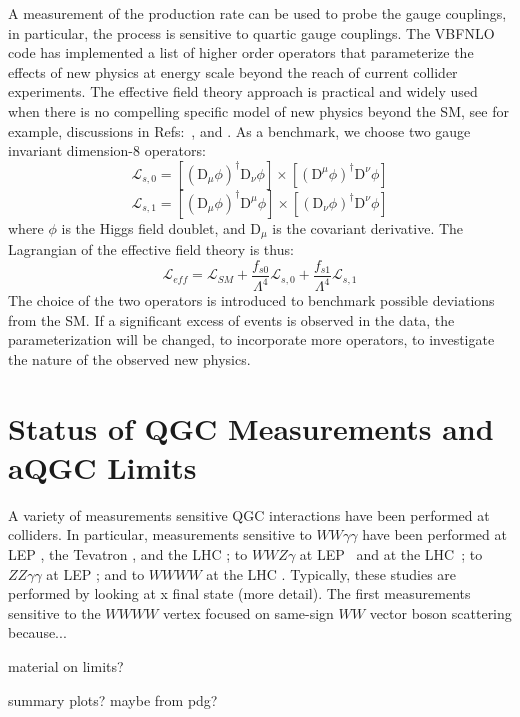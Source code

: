 A measurement
of the production rate can be used to probe the gauge couplings, in
particular, the process is sensitive to quartic gauge couplings. The
{\sc VBFNLO } code has implemented a list of higher order operators
that parameterize the effects of new physics at energy scale beyond
the reach of current collider experiments.  The effective field theory
approach is practical and widely used when there is no compelling
specific model of new physics beyond the SM, see for example,
discussions in Refs:~\cite{Hagiwara:1993ck}, \cite{Buchmuller:1985jz}
and \cite{Eboli:2006wa}.  As a benchmark, we choose two gauge
invariant dimension-8 operators:
\begin{equation}
\mathcal{L}_{s,0} = [(\mathrm{D}_\mu\phi)^\dag\mathrm{D}_\nu \phi]\times [(\mathrm{D}^\mu\phi)^\dag\mathrm{D}^\nu \phi]
\end{equation}
\begin{equation}
\mathcal{L}_{s,1} = [(\mathrm{D}_\mu\phi)^\dag\mathrm{D}^\mu \phi]\times [(\mathrm{D}_\nu\phi)^\dag\mathrm{D}^\nu \phi]
\end{equation}
where $\phi$ is the Higgs field doublet, and $\mathrm{D}_\mu$ is the covariant derivative. 
The Lagrangian of the effective field theory is thus: 
\begin{equation}
\mathcal{L}_{eff} = \mathcal{L}_{SM} + \frac{f_{s0}}{\Lambda^4}\mathcal{L}_{s,0}+\frac{f_{s1}}{\Lambda^4}\mathcal{L}_{s,1}
\end{equation}
The choice of the two operators is introduced to benchmark possible
deviations from the SM. If a significant excess of events is 
observed in the data, the parameterization will be changed, to incorporate 
more operators, to
investigate the nature of the observed new physics.


\section{Status of QGC Measurements and aQGC Limits}
A variety of measurements sensitive QGC interactions have been
performed at colliders. In particular, measurements sensitive
to $WW\gamma\gamma$ have been performed 
at LEP \cite{Abdallah:2003xn,PhysRevD.70.032005}, 
the Tevatron \cite{PhysRevD.88.012005}, %
and the LHC \cite{PhysRevLett.115.031802,PhysRevD.90.032008,Chatrchyan:2013akv}; 
to $WWZ\gamma$ at LEP~\cite{Achard:2001eg,Abbiendi:1999aa,Abbiendi:2003jh}
and at the LHC~\cite{PhysRevD.90.032008};
to $ZZ\gamma\gamma$ at LEP \cite{Achard:2002iz,PhysRevD.70.032005}; 
and to $WWWW$ at the LHC \cite{PhysRevLett.113.141803,PhysRevLett.114.051801}. 
Typically, these studies are performed
by looking at x final state (more detail). 
The first measurements sensitive to the $WWWW$ vertex focused on 
same-sign $WW$ vector boson scattering because...

material on limits?

summary plots? maybe from pdg?


